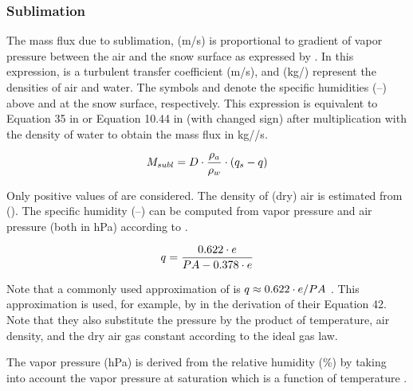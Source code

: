 \subsubsection{Sublimation}
The mass flux due to sublimation, \massfluxSubl{} (m/s) is proportional to gradient of vapor pressure between the air and the snow surface as expressed by . In this expression, \turbTransCoeff{} is a turbulent transfer coefficient (m/s), \densityAir{} and \densityWater{} (kg/\cbm) represent the densities of air and water. The symbols \specHumidity{} and \specHumiditySurface{} denote the specific humidities (--) above and at the snow surface, respectively. This expression is equivalent to Equation 35 in \citet{Tarboton1996} or Equation 10.44 in \citet{Dyck1995} (with changed sign) after multiplication with the density of water \densityWater{} to obtain the mass flux in kg/\sqm/s.

\begin{equation} \label{eqn:snow-enBal_massfluxSubl}
  M_{subl} = D \cdot \frac{\rho_{a}}{\rho_{w}} \cdot (q_s - q)
\end{equation}

Only positive values of \massfluxSubl{} are considered. The density of (dry) air \densityAir{} is estimated from  (). The specific humidity (--) can be computed from vapor pressure \vaporPressure{} and air pressure \airPressure{} (both in hPa) according to  \citep[see Equation 4.10 in][]{Dyck1995}.

\begin{equation} \label{eqn:specHumidity}
  q = \frac{0.622 \cdot e}{PA - 0.378 \cdot e}
\end{equation}

Note that a commonly used approximation of  is $q \approx 0.622 \cdot e / PA$ \citep{Dyck1995}. This approximation is used, for example, by \citet{Tarboton1996} in the derivation of their Equation 42. Note that they also substitute the pressure \airPressure{} by the product of temperature, air density, and the dry air gas constant according to the ideal gas law.

The vapor pressure \vaporPressure{} (hPa) is derived from the relative humidity \relHumidity{} (\%) by  taking into account the vapor pressure at saturation \satVaporPressure{} which is a function of temperature \temperature.


